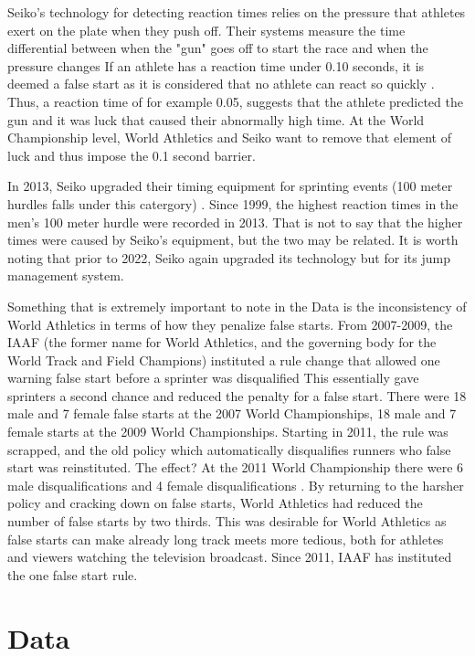 \documentclass[12pt, letterpaper, titlepage]{article}
\begin{document}
Seiko's technology for detecting reaction times relies on the pressure that athletes
exert on the plate when they push off.  Their systems measure the time differential
between when the "gun" goes off to start the race and when the pressure changes 
\citep{Seiko}  If an athlete has a reaction time under 0.10 seconds, it is deemed a 
false start as it is considered that no athlete can react so quickly \citep{Seiko-Timing}.  
Thus, a reaction time of for example 0.05, suggests that the athlete predicted the gun and it
was luck that caused their abnormally high time.  At the World Championship level,
World Athletics and Seiko want to remove that element of luck and thus impose the 0.1
second barrier.

In 2013, Seiko upgraded their timing equipment for sprinting events (100 meter hurdles
falls under this catergory) \citep{WorldAthletics_2013}.  Since 1999, the highest reaction 
times in the men's 100 meter hurdle were recorded in 2013.  That is not to say that the higher 
times were caused by Seiko's equipment, but the two may be related.  It is worth noting that prior
to 2022, Seiko again upgraded its technology but for its jump management system.

Something that is extremely important to note in the Data is the inconsistency of World Athletics 
in terms of how they penalize false starts.  From 2007-2009, the IAAF (the former name for World 
Athletics, and the governing body for the World Track and Field Champions) instituted a rule change
that allowed one warning false start before a sprinter was disqualified \citep{False-Start}  This 
essentially gave sprinters a second chance and reduced the penalty for a false start.  There were 
18 male and 7 female false starts at the 2007 World Championships, 18 male and 7 female starts at 
the 2009 World Championships. Starting in 2011, the rule was scrapped, and the old policy which 
automatically disqualifies runners who false start was reinstituted.  The effect? At the 2011 World
Championship there were 6 male disqualifications and 4 female disqualifications \citep{False-Start}. 
By returning to the harsher policy and cracking down on false starts, World Athletics had reduced the
number of false starts by two thirds. This was desirable for World Athletics as false starts can 
make already long track meets more tedious, both for athletes and viewers watching the 
television broadcast.  Since 2011, IAAF has instituted the one false start rule.\citep{Pilianidis}

\section{Data} \label{sec:data}
\end{document}
